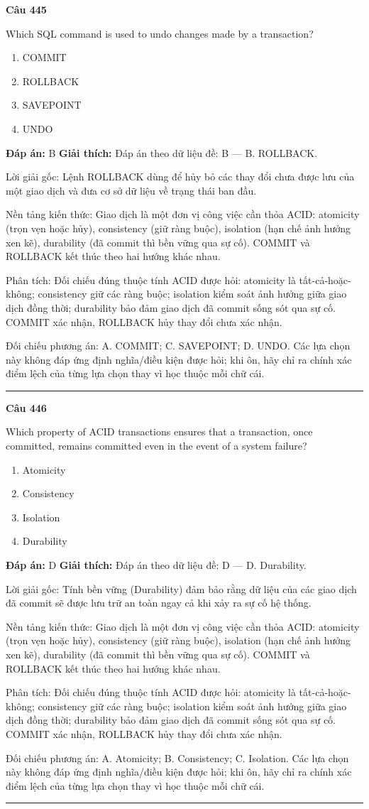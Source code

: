 \documentclass[11pt,a4paper]{article}
\newenvironment{question}[1]{%
  \par\vspace{1em}\noindent\textbf{\large Câu #1}\par\vspace{0.4em}
}{%
  \par\vspace{1em}\hrule\vspace{0.6em}
}
\newenvironment{choices}{%
  \begin{enumerate}[label=\textbf{\Alph*.},leftmargin=2.2em,itemsep=2pt,topsep=3pt]
}{%
  \end{enumerate}
}
\newcommand{\choice}{\item}
\begin{document}
\begin{question}{445}
Which SQL command is used to undo changes made by a transaction?
\begin{choices}
\choice COMMIT
\choice ROLLBACK
\choice SAVEPOINT
\choice UNDO
\end{choices}
\textbf{Đáp án:} B
\textbf{Giải thích:} Đáp án theo dữ liệu đề: B — B. ROLLBACK.

Lời giải gốc: Lệnh ROLLBACK dùng để hủy bỏ các thay đổi chưa được lưu của một giao dịch và đưa cơ sở dữ liệu về trạng thái ban đầu.

Nền tảng kiến thức: Giao dịch là một đơn vị công việc cần thỏa ACID: atomicity (trọn vẹn hoặc hủy), consistency (giữ ràng buộc), isolation (hạn chế ảnh hưởng xen kẽ), durability (đã commit thì bền vững qua sự cố). COMMIT và ROLLBACK kết thúc theo hai hướng khác nhau.

Phân tích: Đối chiếu đúng thuộc tính ACID được hỏi: atomicity là tất-cả-hoặc-không; consistency giữ các ràng buộc; isolation kiểm soát ảnh hưởng giữa giao dịch đồng thời; durability bảo đảm giao dịch đã commit sống sót qua sự cố. COMMIT xác nhận, ROLLBACK hủy thay đổi chưa xác nhận.

Đối chiếu phương án: A. COMMIT; C. SAVEPOINT; D. UNDO. Các lựa chọn này không đáp ứng định nghĩa/điều kiện được hỏi; khi ôn, hãy chỉ ra chính xác điểm lệch của từng lựa chọn thay vì học thuộc mỗi chữ cái.
\end{question}

\begin{question}{446}
Which property of ACID transactions ensures that a transaction, once committed, remains committed even in the event of a system failure?
\begin{choices}
\choice Atomicity
\choice Consistency
\choice Isolation
\choice Durability
\end{choices}
\textbf{Đáp án:} D
\textbf{Giải thích:} Đáp án theo dữ liệu đề: D — D. Durability.

Lời giải gốc: Tính bền vững (Durability) đảm bảo rằng dữ liệu của các giao dịch đã commit sẽ được lưu trữ an toàn ngay cả khi xảy ra sự cố hệ thống.

Nền tảng kiến thức: Giao dịch là một đơn vị công việc cần thỏa ACID: atomicity (trọn vẹn hoặc hủy), consistency (giữ ràng buộc), isolation (hạn chế ảnh hưởng xen kẽ), durability (đã commit thì bền vững qua sự cố). COMMIT và ROLLBACK kết thúc theo hai hướng khác nhau.

Phân tích: Đối chiếu đúng thuộc tính ACID được hỏi: atomicity là tất-cả-hoặc-không; consistency giữ các ràng buộc; isolation kiểm soát ảnh hưởng giữa giao dịch đồng thời; durability bảo đảm giao dịch đã commit sống sót qua sự cố. COMMIT xác nhận, ROLLBACK hủy thay đổi chưa xác nhận.

Đối chiếu phương án: A. Atomicity; B. Consistency; C. Isolation. Các lựa chọn này không đáp ứng định nghĩa/điều kiện được hỏi; khi ôn, hãy chỉ ra chính xác điểm lệch của từng lựa chọn thay vì học thuộc mỗi chữ cái.
\end{question}
\end{document}
